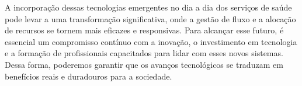\documentclass[conference, a4paper, 12pt]{IEEEtran}
\begin{document}
  A incorporação dessas tecnologias emergentes no dia a dia dos serviços de saúde pode levar a uma transformação significativa, onde a gestão de fluxo e a alocação de recursos se tornem mais eficazes e responsivas. Para alcançar esse futuro, é essencial um compromisso contínuo com a inovação, o investimento em tecnologia e a formação de profissionais capacitados para lidar com esses novos sistemas. Dessa forma, poderemos garantir que os avanços tecnológicos se traduzam em benefícios reais e duradouros para a sociedade.



\end{document}
